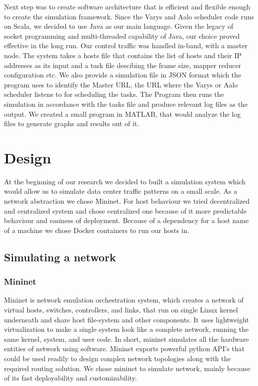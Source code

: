 \documentclass[conference]{IEEEtran}
\begin{document}
Next step was to create software architecture that is efficient and flexible enough to create the simulation framework. Since the Varys and Aalo scheduler code runs on Scala, we decided to use Java as our main language. Given the legacy of socket programming and multi-threaded capability of Java, our choice proved effective in the long run. Our control traffic was handled in-band, with a master node. The system takes a hosts file that contains the list of hosts and their IP addresses as its input and a task file descibing the frame size, mapper reducer configuration etc. We also provide a simulation file in JSON format which the program uses to identify the Master URL, the URL where the Varys or Aalo scheduler listens to for scheduling the tasks. The Program then runs the simulation in accordance with the tasks file and produce relevant log files as the output. We created a small program in MATLAB, that would analyze the log files to generate graphs and results out of it.

\section{Design}

At the beginning of our research we decided to built a simulation system which would allow us to simulate data center traffic patterns on a small scale. As a network abstraction we chose Mininet. For host behaviour we tried decentralized and centralized system and chose centralized one because of it more predictable behaviour and easiness of deployment. Because of a dependency for a host name of a machine we chose Docker containers to run our hosts in.

\subsection{Simulating a network}
\subsubsection{Mininet}
Mininet is network emulation orchestration system, which creates a network of virtual hosts, switches, controllers, and links, that run on single Linux kernel underneath and share host file-system and other components. It uses lightweight virtualization to make a single system look like a complete network, running the same kernel, system, and user code. In short, mininet simulates all the hardware entities of network using software. Mininet exports powerful python API’s that could be used readily to design complex network topologies along with the required routing solution. We chose mininet to simulate network, mainly because of its fast deployability and customizability.
\end{document}

